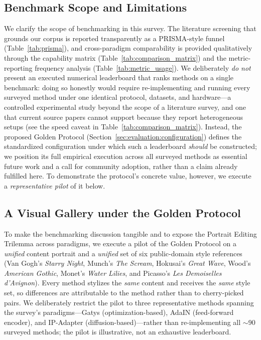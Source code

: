 \documentclass[journal]{IEEEtran}
\begin{document}
\subsection{Benchmark Scope and Limitations}
\label{sec:evaluation:benchmark_scope}
We clarify the scope of benchmarking in this survey. The literature screening that grounds our corpus is reported transparently as a PRISMA-style funnel (Table~\ref{tab:prisma}), and cross-paradigm comparability is provided qualitatively through the capability matrix (Table~\ref{tab:comparison_matrix}) and the metric-reporting frequency analysis (Table~\ref{tab:metric_usage}). We deliberately \textit{do not} present an executed numerical leaderboard that ranks methods on a single benchmark: doing so honestly would require re-implementing and running every surveyed method under one identical protocol, datasets, and hardware---a controlled experimental study beyond the scope of a literature survey, and one that current source papers cannot support because they report heterogeneous setups (see the speed caveat in Table~\ref{tab:comparison_matrix}). Instead, the proposed Golden Protocol (Section~\ref{sec:evaluation:configuration}) defines the standardized configuration under which such a leaderboard \textit{should} be constructed; we position its full empirical execution across all surveyed methods as essential future work and a call for community adoption, rather than a claim already fulfilled here. To demonstrate the protocol's concrete value, however, we execute a \textit{representative pilot} of it below.

\subsection{A Visual Gallery under the Golden Protocol}
\label{sec:evaluation:gallery}

To make the benchmarking discussion tangible and to expose the Portrait Editing Trilemma across paradigms, we execute a pilot of the Golden Protocol on a \textit{unified} content portrait and a \textit{unified} set of six public-domain style references (Van Gogh's \emph{Starry Night}, Munch's \emph{The Scream}, Hokusai's \emph{Great Wave}, Wood's \emph{American Gothic}, Monet's \emph{Water Lilies}, and Picasso's \emph{Les Demoiselles d'Avignon}). Every method stylizes the \emph{same} content and receives the \emph{same} style set, so differences are attributable to the method rather than to cherry-picked pairs. We deliberately restrict the pilot to three representative methods spanning the survey's paradigms---Gatys \cite{gatys2016image} (optimization-based), AdaIN \cite{huang2017arbitraryst} (feed-forward encoder), and IP-Adapter \cite{ye2023ipadapter} (diffusion-based)---rather than re-implementing all $\sim$90 surveyed methods; the pilot is illustrative, not an exhaustive leaderboard.
\end{document}
